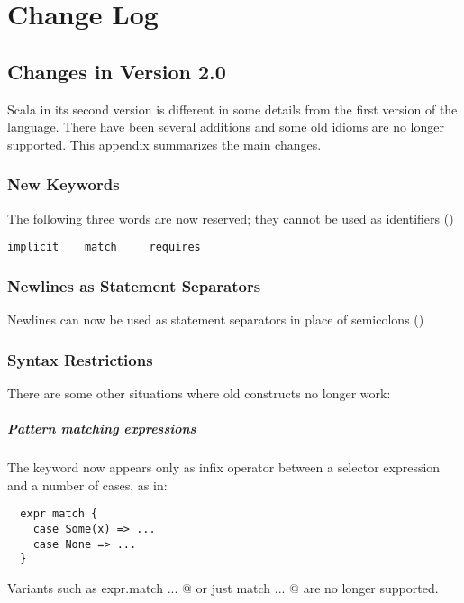 \chapter{Change Log}

\section{Changes in Version 2.0}

Scala in its second version is different in some details from the
first version of the language. There have been several additions and
some old idioms are no longer supported. This appendix summarizes
the main changes.

\subsection*{New Keywords}

The following three words are now reserved; they cannot be used as
identifiers ()
\begin{lstlisting}
implicit    match     requires
\end{lstlisting}

\subsection*{Newlines as Statement Separators}

Newlines can now be used as statement separators in place of
semicolons ()

\subsection*{Syntax Restrictions}

There are some other situations where old constructs no longer work:

\paragraph{\em Pattern matching expressions} The \lstinline@match@
keyword now appears only as infix operator between a selector
expression and a number of cases, as in:
\begin{lstlisting}
  expr match {
    case Some(x) => ...
    case None => ...
  }
\end{lstlisting}
Variants such as \lstinline@ expr.match {...} @ 
or just
\lstinline@ match {...} @
are no longer supported.

